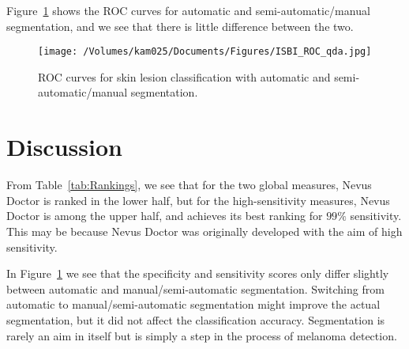 \documentclass[a4paper,12pt]{article}
\begin{document}
Figure~\ref{fig:ROC} shows the ROC curves for automatic and semi-automatic/manual segmentation, and we see that there is little difference between the two. 
  \begin{figure}[h!]
     \texttt{[image: /Volumes/kam025/Documents/Figures/ISBI\_ROC\_qda.jpg]}
      \caption{ROC curves for skin lesion classification with automatic and semi-automatic/manual segmentation.}
       \label{fig:ROC}
   \end{figure}
 
\section{Discussion} \label{sec:Discussion} %

From Table~\ref{tab:Rankings}, we see that for the two global measures, Nevus Doctor is ranked in the lower half, but for the high-sensitivity measures, Nevus Doctor is among the upper half, and achieves its best ranking for $99\%$ sensitivity. This may be because Nevus Doctor was originally developed with the aim of high sensitivity. 

In Figure~\ref{fig:ROC} we see that the specificity and sensitivity scores only differ slightly between automatic and manual/semi-automatic segmentation. Switching from automatic to manual/semi-automatic segmentation might improve the actual segmentation, but it did not affect the classification accuracy. Segmentation is rarely an aim in itself but is simply a step in the process of melanoma detection. 
\end{document}
